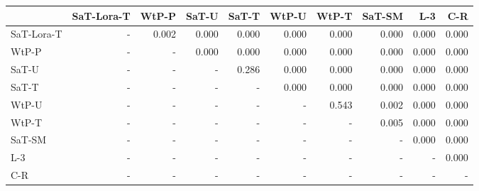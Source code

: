 \begin{tabular}{lrrrrrrrrr}
\toprule
 & SaT-Lora-T & WtP-P & SaT-U & SaT-T & WtP-U & WtP-T & SaT-SM & L-3 & C-R \\
\midrule
SaT-Lora-T & - & 0.002 & 0.000 & 0.000 & 0.000 & 0.000 & 0.000 & 0.000 & 0.000 \\
WtP-P & - & - & 0.000 & 0.000 & 0.000 & 0.000 & 0.000 & 0.000 & 0.000 \\
SaT-U & - & - & - & 0.286 & 0.000 & 0.000 & 0.000 & 0.000 & 0.000 \\
SaT-T & - & - & - & - & 0.000 & 0.000 & 0.000 & 0.000 & 0.000 \\
WtP-U & - & - & - & - & - & 0.543 & 0.002 & 0.000 & 0.000 \\
WtP-T & - & - & - & - & - & - & 0.005 & 0.000 & 0.000 \\
SaT-SM & - & - & - & - & - & - & - & 0.000 & 0.000 \\
L-3 & - & - & - & - & - & - & - & - & 0.000 \\
C-R & - & - & - & - & - & - & - & - & - \\
\bottomrule
\end{tabular}

